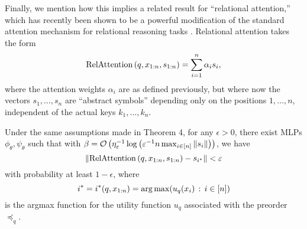 Finally, we mention how this implies a related result for ``relational attention,'' which has recently been shown to be a powerful modification of the standard attention mechanism for relational reasoning tasks
\citep{altabaaAbstractorsRelationalCrossattention2024,altabaa2024disentanglingintegratingrelationalsensory}.
Relational attention takes the form
\begin{equation}\label{eq:def_relattention}
\mathrm{RelAttention}\paren{q, x_{1:n}, s_{1:n}} = \sum_{i=1}^n \alpha_i s_i,
\end{equation}
where the attention weights $\alpha_i$ are as defined previously, but where now
the vectors $s_1,\ldots, s_n$ are ``abstract symbols'' depending only on the positions $1,\ldots, n$,
independent of the actual keys $k_1,\ldots, k_n$.

\begin{corollary}
    Under the same assumptions made in Theorem 4, 
    for any $\epsilon > 0$, there exist MLPs $\phi_\theta, \psi_\theta$ such that with $\beta = {\mathcal{O}}\left(\eta_\varepsilon^{-1} \log\left(\varepsilon^{-1} n \max_{i \in [n]} \left\lVert s_i\right\rVert\right)\right)$, we have
    \begin{equation*}
        \left\lVert\mathrm{RelAttention}\left(q, x_{1:n}, s_{1:n}\right) - s_{i^*}\right\rVert < \varepsilon
    \end{equation*}
    with probability at least $1 - \epsilon$, where 
    $$i^* = i^*(q,x_{1:n}) = \operatorname*{arg\,max}(u_q(x_i)\,:\, i\in[n])$$ 
    is the argmax function for the utility function $u_q$ associated with 
    the preorder $\preceq_q$.
\end{corollary}


